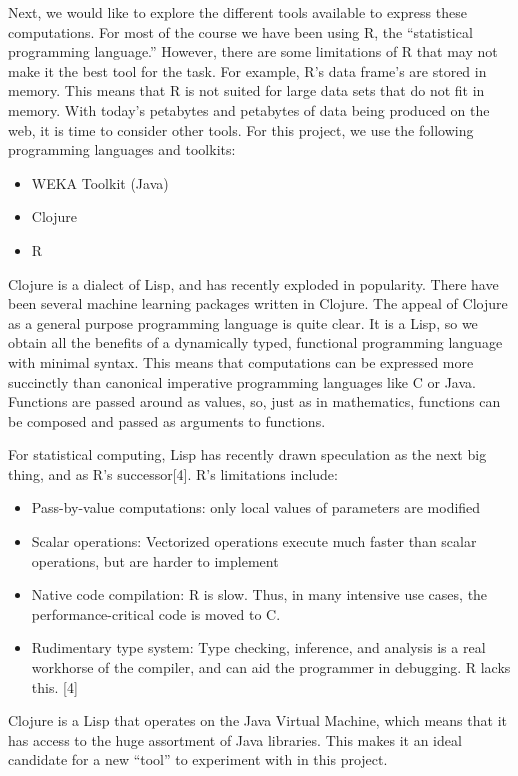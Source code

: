 \documentclass[a4paper,10pt]{article}
\begin{document}
Next, we would like to explore the different tools available to express these computations. For most of the course
we have been using R, the ``statistical programming language.'' However, there are some limitations of R that 
may not make it the best tool for the task. For example, R's data frame's are stored in memory. This means that
R is not suited for large data sets that do not fit in memory. With today's petabytes and petabytes of data being
produced on the web, it is time to consider other tools. For this project, we use the following programming languages
and toolkits:

\begin{itemize}
 \item WEKA Toolkit (Java)
 \item Clojure
 \item R
\end{itemize}

Clojure is a dialect of Lisp, and has recently exploded in popularity. There have been several machine learning
packages written in Clojure. The appeal of Clojure as a general purpose programming language is quite clear.
It is a Lisp, so we obtain all the benefits of a dynamically typed, functional programming language with minimal syntax.
This means that computations can be expressed more succinctly than canonical imperative programming languages like
C or Java. Functions are passed around as values, so, just as in mathematics, functions can be composed and passed
as arguments to functions.

For statistical computing, Lisp has recently drawn speculation as the next big thing, and as R's successor[4]. R's limitations
include:

\begin{itemize}
 \item Pass-by-value computations: only local values of parameters are modified
 \item Scalar operations: Vectorized operations execute much faster than scalar operations, but are harder to implement
   \item Native code compilation: R is slow. Thus, in many intensive use cases, the performance-critical code is moved to C.
 \item Rudimentary type system: Type checking, inference, and analysis is a real workhorse of the compiler, and can aid the programmer
 in debugging. R lacks this. [4]
\end{itemize}

Clojure is a Lisp that operates on the Java Virtual Machine, which means that it has access to the huge assortment of Java
libraries. This makes it an ideal candidate for a new ``tool'' to experiment with in this project.
\end{document}
